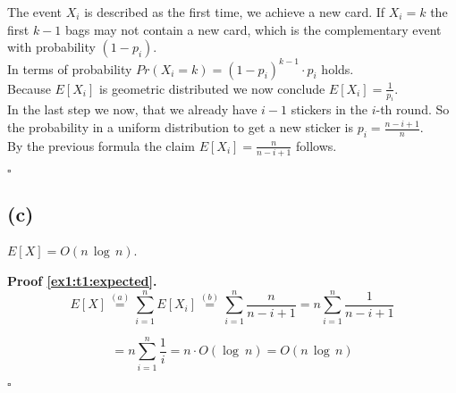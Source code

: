 The event $X_i$ is described as the first time, we achieve a new card. If $X_i = k$ the first $k-1$ bags
may not contain a new card, which is the complementary event with probability $(1- p_i)$.\\

In terms of probability $Pr(X_i = k) = (1 - p_i)^{k-1} \cdot p_i$ holds.\\

Because $E [X_i ]$ is geometric distributed we now conclude
$E[ X_i ] = \frac{1}{p_i}$.\\

In the last step we now, that we already have $i-1$ stickers in the $i$-th round. So the probability
in a uniform distribution to get a new sticker is $p_i = \frac{n - i + 1}{n}$.\\
By the previous formula the claim $E[ X_i ] = \frac{n}{n - i + 1}$ follows.

\mbox{} \hfill $\square$


\subsection*{(c)}

\begin{lemma}\label{ex1:t1:expected}
    $E[X]= O(n\, \log\, n)$.
\end{lemma}


\textbf{Proof \ref{ex1:t1:expected}.}\\
\[
E[X]\stackrel{(a)}{=}\sum_{i=1}^{n}E[X_{i}]\stackrel{(b)}{=}\sum_{i=1}^{n}\frac{n}{n-i+1}=n\sum_{i=1}^{n}\frac{1}{n-i+1}
\]


\[
=n\sum_{i=1}^{n}\frac{1}{i}=n\cdot O(\log\: n)=O(n\, \log\, n)
\]


\mbox{} \hfill $\square$
